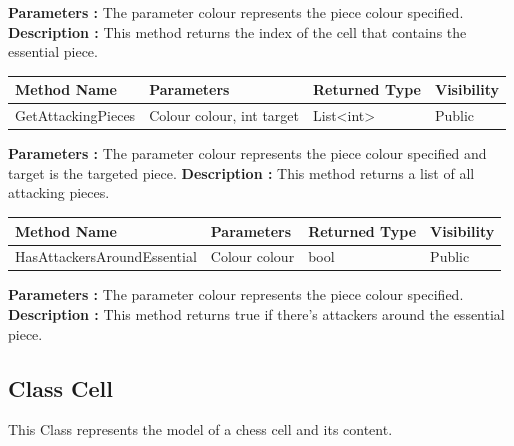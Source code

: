 \documentclass[12pt]{article}
\begin{document}
\textbf{Parameters :} The parameter colour represents the piece colour specified.
\textbf{Description :} This method returns the index of the cell that contains the essential piece.

\begin{table}[H]
    \begin{tabular}{|l|l|l|l|}
    \hline
    \rowcolor[HTML]{EFEFEF} 
    \cellcolor[HTML]{EFEFEF}\textbf{Method Name} & \textbf{Parameters}        & \textbf{Returned Type} & \textbf{Visibility} \\ \hline
    GetAttackingPieces                           & Colour colour, int target  & List<int>                   & Public              \\ \hline
    \end{tabular}
\end{table}

\textbf{Parameters :} The parameter colour represents the piece colour specified and target is the targeted piece.
\textbf{Description :} This method returns a list of all attacking pieces.

\begin{table}[H]
    \begin{tabular}{|l|l|l|l|}
    \hline
    \rowcolor[HTML]{EFEFEF} 
    \cellcolor[HTML]{EFEFEF}\textbf{Method Name} & \textbf{Parameters}     & \textbf{Returned Type} & \textbf{Visibility} \\ \hline
    HasAttackersAroundEssential                  & Colour colour           & bool                   & Public              \\ \hline
    \end{tabular}
\end{table}

\textbf{Parameters :} The parameter colour represents the piece colour specified.
\textbf{Description :} This method returns true if there's attackers around the essential piece.

\newpage


\subsection{Class Cell}

This Class represents the model of a chess cell and its content.
\end{document}
